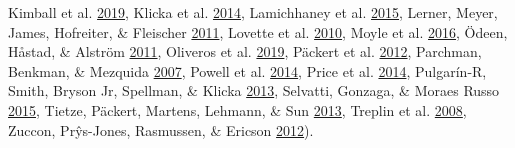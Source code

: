 \documentclass[english,man]{apa6}
\begin{document}
\begin{minipage}{18.2cm}
{Kimball et al. \protect\hyperlink{ref-kimball2019phylogenomic}{2019},
Klicka et al. \protect\hyperlink{ref-klicka2014comprehensive}{2014},
Lamichhaney et al. \protect\hyperlink{ref-lamichhaney2015evolution}{2015},
Lerner, Meyer, James, Hofreiter, \& Fleischer \protect\hyperlink{ref-lerner2011multilocus}{2011},
Lovette et al. \protect\hyperlink{ref-lovette2010comprehensive}{2010},
Moyle et al. \protect\hyperlink{ref-moyle2016tectonic}{2016},
Ödeen, Håstad, \& Alström \protect\hyperlink{ref-odeen2011evolution}{2011},
Oliveros et al. \protect\hyperlink{ref-oliveros2019earth}{2019},
Päckert et al. \protect\hyperlink{ref-packert2012horizontal}{2012},
Parchman, Benkman, \& Mezquida \protect\hyperlink{ref-parchman2007coevolution}{2007},
Powell et al. \protect\hyperlink{ref-powell2014comprehensive}{2014},
  Price et al. \protect\hyperlink{ref-price2014niche}{2014},
  Pulgarín-R, Smith, Bryson Jr, Spellman, \& Klicka \protect\hyperlink{ref-pulgarin2013multilocus}{2013},
  Selvatti, Gonzaga, \& Moraes Russo \protect\hyperlink{ref-selvatti2015paleogene}{2015},
  Tietze, Päckert, Martens, Lehmann, \& Sun \protect\hyperlink{ref-tietze2013complete}{2013},
  Treplin et al. \protect\hyperlink{ref-treplin2008molecular}{2008},
  Zuccon, Prŷs-Jones, Rasmussen, \& Ericson \protect\hyperlink{ref-zuccon2012phylogenetic}{2012}).}
\label{fig:fringillidae-topologies}
\end{minipage}
\end{document}
